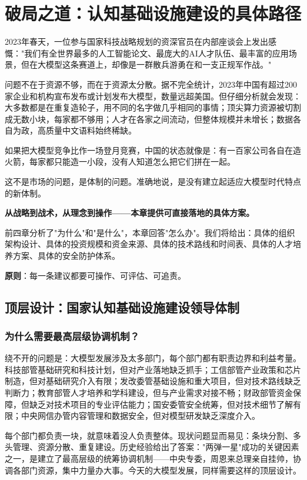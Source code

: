 \chapter{破局之道：认知基础设施建设的具体路径}

2023年春天，一位参与国家科技战略规划的资深官员在内部座谈会上发出感慨："我们有全世界最多的人工智能论文、最庞大的AI人才队伍、最丰富的应用场景，但在大模型这条赛道上，却像是一群散兵游勇在和一支正规军作战。"

问题不在于资源不够，而在于资源太分散。据不完全统计，2023年中国有超过200家企业和机构宣布发布或计划发布大模型，数量远超美国。但仔细分析就会发现：大多数都是在重复造轮子，用不同的名字做几乎相同的事情；顶尖算力资源被切割成无数小块，每家都不够用；人才在各家之间流动，但整体规模并未增长；数据各自为政，高质量中文语料始终稀缺。

如果把大模型竞争比作一场登月竞赛，中国的状态就像是：有一百家公司各自在造火箭，每家都只能造一小段，没有人知道怎么把它们拼在一起。

这不是市场的问题，是体制的问题。准确地说，是没有建立起适应大模型时代特点的新体制。

\textbf{从战略到战术，从理念到操作——本章提供可直接落地的具体方案。}

前四章分析了"为什么"和"是什么"，本章回答"怎么办"。我们将给出：具体的组织架构设计、具体的投资规模和资金来源、具体的技术路线和时间表、具体的人才培养方案、具体的安全防护体系。

\textbf{原则}：每一条建议都要可操作、可评估、可追责。

\section{顶层设计：国家认知基础设施建设领导体制}

\subsection{为什么需要最高层级协调机制？}

绕不开的问题是：大模型发展涉及太多部门，每个部门都有职责边界和利益考量。科技部管基础研究和科技计划，但对产业落地缺乏抓手；工信部管产业政策和芯片制造，但对基础研究介入有限；发改委管基础设施和重大项目，但对技术路线缺乏判断力；教育部管人才培养和学科建设，但与产业需求对接不畅；财政部管资金保障，但缺乏对技术项目的专业评估能力；国安委管安全统筹，但对技术细节了解有限；中央网信办管内容管理和数据安全，但对模型研发缺乏深度介入。

每个部门都负责一块，就意味着没人负责整体。现状问题显而易见：条块分割、多头管理、资源分散、重复建设。历史经验给出了答案："两弹一星"成功的关键因素之一，是建立了最高层级的统筹协调机制——中央专委，周恩来总理亲自挂帅，协调各部门资源，集中力量办大事。今天的大模型发展，同样需要这样的顶层设计。


